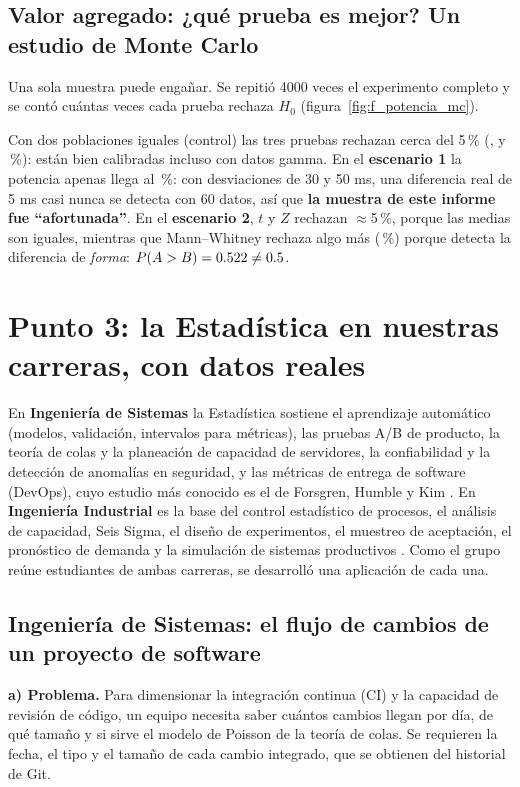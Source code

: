 \documentclass[11pt]{article}
\begin{document}
\subsection*{Valor agregado: ¿qué prueba es mejor? Un estudio de Monte Carlo}
Una sola muestra puede engañar. Se repitió 4000 veces el experimento completo y se contó cuántas veces cada prueba
rechaza $H_0$ (figura~\ref{fig:f_potencia_mc}).
\begin{lectura}
Con dos poblaciones iguales (control) las tres pruebas rechazan cerca del 5\,\% (\mcTCtrl, \mcZCtrl{} y
\mcMwCtrl\,\%): están bien calibradas incluso con datos gamma. En el \textbf{escenario 1} la potencia apenas llega
al \mcTUno\,\%: con desviaciones de 30 y 50 ms, una diferencia real de 5 ms casi nunca se detecta con 60 datos, así
que \textbf{la muestra de este informe fue ``afortunada''}. En el \textbf{escenario 2}, $t$ y $Z$ rechazan
$\approx$5\,\%, porque las medias son iguales, mientras que Mann–Whitney rechaza algo más (\mcMwDos\,\%) porque
detecta la diferencia de \emph{forma}: $P(A>B)=0.522\neq0.5$.
\end{lectura}

\section{Punto 3: la Estadística en nuestras carreras, con datos reales}\label{sec:p3}
En \textbf{Ingeniería de Sistemas} la Estadística sostiene el aprendizaje automático (modelos, validación,
intervalos para métricas), las pruebas A/B de producto, la teoría de colas y la planeación de capacidad de
servidores, la confiabilidad y la detección de anomalías en seguridad, y las métricas de entrega de software
(DevOps), cuyo estudio más conocido es el de Forsgren, Humble y Kim \cite{accelerate}. En \textbf{Ingeniería
Industrial} es la base del control estadístico de procesos, el análisis de capacidad, Seis Sigma, el diseño de
experimentos, el muestreo de aceptación, el pronóstico de demanda y la simulación de sistemas productivos
\cite{montgomeryqc}. Como el grupo reúne estudiantes de ambas carreras, se desarrolló una aplicación de cada una.

\subsection{Ingeniería de Sistemas: el flujo de cambios de un proyecto de software}
\textbf{a) Problema.} Para dimensionar la integración continua (CI) y la capacidad de revisión de código, un equipo
necesita saber cuántos cambios llegan por día, de qué tamaño y si sirve el modelo de Poisson de la teoría de colas.
Se requieren la fecha, el tipo y el tamaño de cada cambio integrado, que se obtienen del historial de Git.
\end{document}
